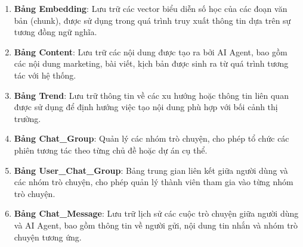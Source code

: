 \begin{enumerate}
  liệu. Mỗi tài liệu được phân chia thành các đoạn văn bản có kích thước
  phù hợp để xử lý và tạo embedding.
\item
  \textbf{Bảng Embedding}: Lưu trữ các vector biểu diễn số học của các
  đoạn văn bản (chunk), được sử dụng trong quá trình truy xuất thông tin
  dựa trên sự tương đồng ngữ nghĩa.
\item
  \textbf{Bảng Content}: Lưu trữ các nội dung được tạo ra bởi AI Agent,
  bao gồm các nội dung marketing, bài viết, kịch bản được sinh ra từ quá
  trình tương tác với hệ thống.
\item
  \textbf{Bảng Trend}: Lưu trữ thông tin về các xu hướng hoặc thông tin
  liên quan được sử dụng để định hướng việc tạo nội dung phù hợp với bối
  cảnh thị trường.
\item
  \textbf{Bảng Chat\_Group}: Quản lý các nhóm trò chuyện, cho phép tổ
  chức các phiên tương tác theo từng chủ đề hoặc dự án cụ thể.
\item
  \textbf{Bảng User\_Chat\_Group}: Bảng trung gian liên kết giữa người
  dùng và các nhóm trò chuyện, cho phép quản lý thành viên tham gia vào
  từng nhóm trò chuyện.
\item
  \textbf{Bảng Chat\_Message}: Lưu trữ lịch sử các cuộc trò chuyện giữa
  người dùng và AI Agent, bao gồm thông tin về người gửi, nội dung tin
  nhắn và nhóm trò chuyện tương ứng.
\end{enumerate}
